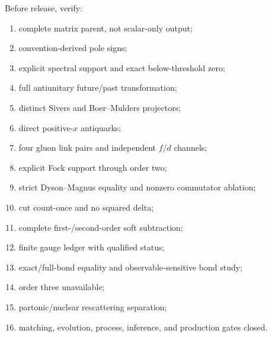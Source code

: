 \documentclass[11pt]{article}
\begin{document}
Before release, verify:
\begin{enumerate}
 \item complete matrix parent, not scalar-only output;
 \item convention-derived pole signs;
 \item explicit spectral support and exact below-threshold zero;
 \item full antiunitary future/past transformation;
 \item distinct Sivers and Boer--Mulders projectors;
 \item direct positive-\(x\) antiquarks;
 \item four gluon link pairs and independent \(f/d\) channels;
 \item explicit Fock support through order two;
 \item strict Dyson--Magnus equality and nonzero commutator ablation;
 \item cut count-once and no squared delta;
 \item complete first-/second-order soft subtraction;
 \item finite gauge ledger with qualified status;
 \item exact/full-bond equality and observable-sensitive bond study;
 \item order three unavailable;
 \item partonic/nuclear rescattering separation;
 \item matching, evolution, process, inference, and production gates closed.
\end{enumerate}
\end{document}
